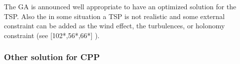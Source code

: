 The GA is announced well appropriate to have an optimized solution for the TSP. 
Also the in some situation a  TSP is not realistic and some external constraint can be added as the wind effect, the turbulences, or holonomy constraint (see [102*,56*,66*] \citep{66*galceran2013}).
 
 


 



\subsubsection{Other solution for CPP}

%
%
%
%	
%
	
